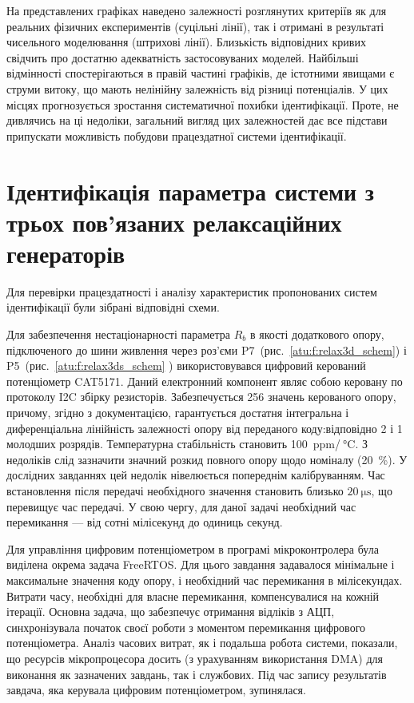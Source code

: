 На представлених графіках наведено залежності розглянутих
критеріїв як для реальних фізичних експериментів (суцільні
лінії), так і отримані в результаті чисельного моделювання
(штрихові лінії). Близькість відповідних кривих свідчить про
достатню адекватність застосовуваних моделей. Найбільші
відмінності спостерігаються в правій частині графіків,
де істотними явищами є струми витоку, що мають нелінійну
залежність від різниці потенціалів. У цих місцях прогнозується
зростання систематичної похибки ідентифікації. Проте, не
дивлячись на ці недоліки, загальний вигляд цих залежностей
дає все підстави припускати можливість побудови працездатної
системи ідентифікації.


\section{Ідентифікація параметра системи з трьох пов'язаних релаксаційних генераторів}

Для перевірки працездатності і аналізу характеристик
пропонованих систем ідентифікації були зібрані відповідні
схеми.

Для забезпечення нестаціонарності параметра
$R_b$ в якості додаткового опору, підключеного до шини живлення
через роз'єми P7~(рис.~\ref{atu:f:relax3d_schem}) і P5~(рис.~\ref{atu:f:relax3ds_schem} )
використовувався цифровий керований потенціометр CAT5171. Даний
електронний компонент являє собою керовану по протоколу
I2C збірку резисторів. Забезпечується 256 значень керованого
опору, причому, згідно з документацією, гарантується достатня
інтегральна і диференціальна лінійність залежності опору від
переданого коду:відповідно 2 і 1 молодших розрядів. Температурна
стабільність становить 100~ppm/${}\SI{}{\celsius} $.
З недоліків слід зазначити значний розкид повного
опору щодо номіналу (20~\%). У дослідних завданнях цей недолік
нівелюється попереднім калібруванням. Час встановлення після
передачі необхідного значення становить близько
$\SI{20}{\micro \second} $, що перевищує час передачі. У свою чергу, для
даної задачі необхідний час перемикання --- від сотні
мілісекунд до одиниць секунд.

Для управління цифровим потенціометром в програмі
мікроконтролера була виділена окрема задача FreeRTOS. Для цього
завдання задавалося мінімальне і максимальне значення коду
опору, і необхідний час перемикання в мілісекундах. Витрати часу,
необхідні для власне перемикання, компенсувалися на кожній
ітерації. Основна задача, що забезпечує отримання відліків з
АЦП, синхронізувала початок своєї роботи з моментом перемикання
цифрового потенціометра. Аналіз часових витрат, як і подальша
робота системи, показали, що ресурсів мікропроцесора досить
(з урахуванням використання DMA) для виконання як зазначених
завдань, так і службових. Під час запису результатів завдача,
яка керувала цифровим потенціометром, зупинялася.

